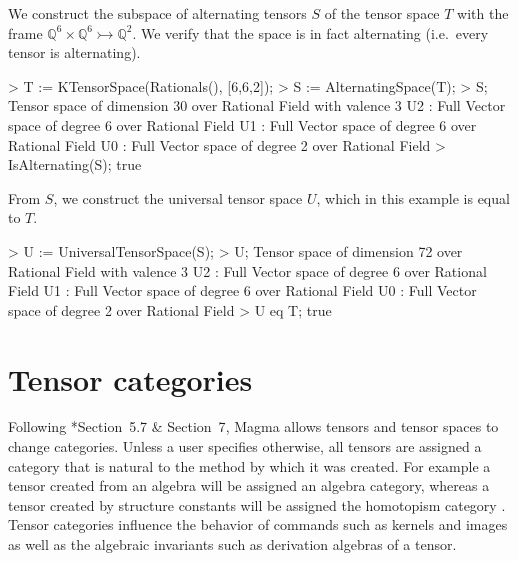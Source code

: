 \begin{example}[UniversalConst]

We construct the subspace of alternating tensors $S$ of the tensor space $T$
with the frame $\mathbb{Q}^6\times\mathbb{Q}^6\rightarrowtail \mathbb{Q}^2$. We
verify that the space is in fact alternating (i.e.\ every tensor is
alternating).
\begin{code}
> T := KTensorSpace(Rationals(), [6,6,2]);
> S := AlternatingSpace(T);
> S;
Tensor space of dimension 30 over Rational Field with valence 3
U2 : Full Vector space of degree 6 over Rational Field
U1 : Full Vector space of degree 6 over Rational Field
U0 : Full Vector space of degree 2 over Rational Field
> IsAlternating(S);
true
\end{code}

From $S$, we construct the universal tensor space $U$, which in this example is equal to $T$. 
\begin{code}
> U := UniversalTensorSpace(S);
> U;
Tensor space of dimension 72 over Rational Field with valence 3
U2 : Full Vector space of degree 6 over Rational Field
U1 : Full Vector space of degree 6 over Rational Field
U0 : Full Vector space of degree 2 over Rational Field
> U eq T;
true
\end{code}
\end{example}









































\chapter{Tensor categories}\label{ch:tensor-categories}

Following \cite{FMW:densors}*{Section~5.7 \& Section~7}, Magma allows tensors
and tensor spaces to change categories. Unless a user specifies otherwise, all
tensors are assigned a category that is natural to the method by which it was
created. For example a tensor created from an algebra will be assigned an
algebra category, whereas a tensor created by structure constants will be
assigned the homotopism category . Tensor categories
influence the behavior of commands such as kernels and images as well as the
algebraic invariants such as derivation algebras of a tensor.  

